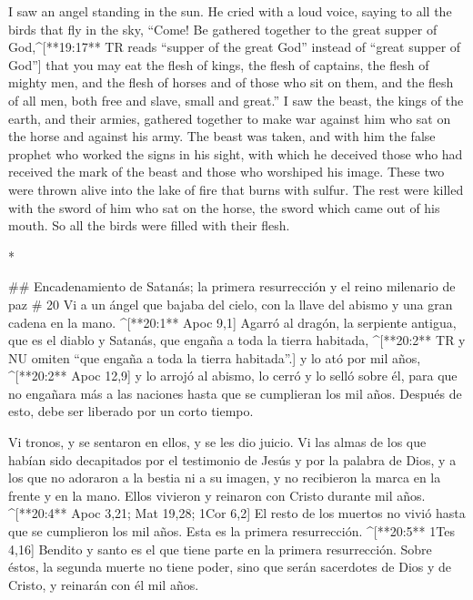 \begin{paracols}{2}
\begin{english}
 I saw an angel standing in the sun. He cried with a loud voice, saying to all the birds that fly in the sky, “Come! Be gathered together to the great supper of God,^[**19:17** TR reads “supper of the great God” instead of “great supper of God”]  that you may eat the flesh of kings, the flesh of captains, the flesh of mighty men, and the flesh of horses and of those who sit on them, and the flesh of all men, both free and slave, small and great.”  I saw the beast, the kings of the earth, and their armies, gathered together to make war against him who sat on the horse and against his army.  The beast was taken, and with him the false prophet who worked the signs in his sight, with which he deceived those who had received the mark of the beast and those who worshiped his image. These two were thrown alive into the lake of fire that burns with sulfur.  The rest were killed with the sword of him who sat on the horse, the sword which came out of his mouth. So all the birds were filled with their flesh.

\end{english}
\switchcolumn[0]*

## Encadenamiento de Satanás; la primera resurrección y el reino milenario de paz
# 20
 Vi a un ángel que bajaba del cielo, con la llave del abismo y una gran cadena en la mano. ^[**20:1** Apoc 9,1]  Agarró al dragón, la serpiente antigua, que es el diablo y Satanás, que engaña a toda la tierra habitada, ^[**20:2** TR y NU omiten “que engaña a toda la tierra habitada”.] y lo ató por mil años, ^[**20:2** Apoc 12,9]  y lo arrojó al abismo, lo cerró y lo selló sobre él, para que no engañara más a las naciones hasta que se cumplieran los mil años. Después de esto, debe ser liberado por un corto tiempo.

 Vi tronos, y se sentaron en ellos, y se les dio juicio. Vi las almas de los que habían sido decapitados por el testimonio de Jesús y por la palabra de Dios, y a los que no adoraron a la bestia ni a su imagen, y no recibieron la marca en la frente y en la mano. Ellos vivieron y reinaron con Cristo durante mil años. ^[**20:4** Apoc 3,21; Mat 19,28; 1Cor 6,2]  El resto de los muertos no vivió hasta que se cumplieron los mil años. Esta es la primera resurrección. ^[**20:5** 1Tes 4,16]  Bendito y santo es el que tiene parte en la primera resurrección. Sobre éstos, la segunda muerte no tiene poder, sino que serán sacerdotes de Dios y de Cristo, y reinarán con él mil años.


\end{paracols}
